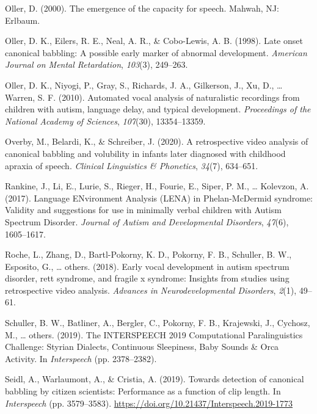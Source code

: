 \documentclass[english,,man]{apa6}
\begin{document}
\leavevmode\hypertarget{ref-oller2000emergence}{}%
Oller, D. (2000). The emergence of the capacity for speech. Mahwah, NJ: Erlbaum.

\leavevmode\hypertarget{ref-oller1998late}{}%
Oller, D. K., Eilers, R. E., Neal, A. R., \& Cobo-Lewis, A. B. (1998). Late onset canonical babbling: A possible early marker of abnormal development. \emph{American Journal on Mental Retardation}, \emph{103}(3), 249--263.

\leavevmode\hypertarget{ref-oller2010automated}{}%
Oller, D. K., Niyogi, P., Gray, S., Richards, J. A., Gilkerson, J., Xu, D., \ldots{} Warren, S. F. (2010). Automated vocal analysis of naturalistic recordings from children with autism, language delay, and typical development. \emph{Proceedings of the National Academy of Sciences}, \emph{107}(30), 13354--13359.

\leavevmode\hypertarget{ref-overby2020retrospective}{}%
Overby, M., Belardi, K., \& Schreiber, J. (2020). A retrospective video analysis of canonical babbling and volubility in infants later diagnosed with childhood apraxia of speech. \emph{Clinical Linguistics \& Phonetics}, \emph{34}(7), 634--651.

\leavevmode\hypertarget{ref-rankine2017language}{}%
Rankine, J., Li, E., Lurie, S., Rieger, H., Fourie, E., Siper, P. M., \ldots{} Kolevzon, A. (2017). Language ENvironment Analysis (LENA) in Phelan-McDermid syndrome: Validity and suggestions for use in minimally verbal children with Autism Spectrum Disorder. \emph{Journal of Autism and Developmental Disorders}, \emph{47}(6), 1605--1617.

\leavevmode\hypertarget{ref-roche2018early}{}%
Roche, L., Zhang, D., Bartl-Pokorny, K. D., Pokorny, F. B., Schuller, B. W., Esposito, G., \ldots{} others. (2018). Early vocal development in autism spectrum disorder, rett syndrome, and fragile x syndrome: Insights from studies using retrospective video analysis. \emph{Advances in Neurodevelopmental Disorders}, \emph{2}(1), 49--61.

\leavevmode\hypertarget{ref-schuller2019interspeech}{}%
Schuller, B. W., Batliner, A., Bergler, C., Pokorny, F. B., Krajewski, J., Cychosz, M., \ldots{} others. (2019). The INTERSPEECH 2019 Computational Paralinguistics Challenge: Styrian Dialects, Continuous Sleepiness, Baby Sounds \& Orca Activity. In \emph{Interspeech} (pp. 2378--2382).

\leavevmode\hypertarget{ref-Seidl19}{}%
Seidl, A., Warlaumont, A., \& Cristia, A. (2019). Towards detection of canonical babbling by citizen scientists: Performance as a function of clip length. In \emph{Interspeech} (pp. 3579--3583). \url{https://doi.org/10.21437/Interspeech.2019-1773}
\end{document}
